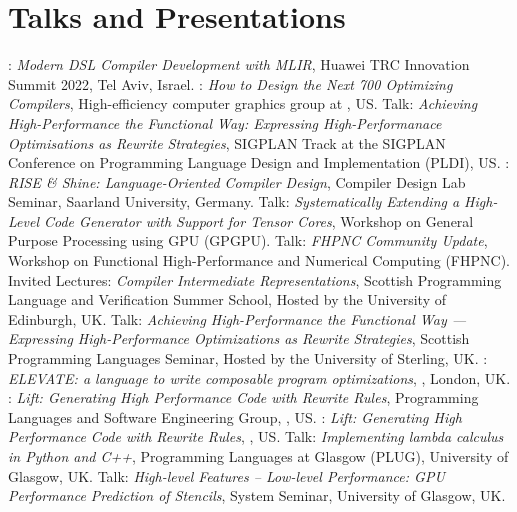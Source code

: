 \section{Talks and Presentations}
  {:
    \emph{Modern DSL Compiler Development with MLIR},
    \small Huawei TRC Innovation Summit 2022, Tel Aviv, Israel.}
  {:
    \emph{How to Design the Next 700 Optimizing Compilers},
    \small High-efficiency computer graphics group at , US.}
  {Talk: \emph{Achieving High-Performance the Functional Way: Expressing High-Performanace Optimisations as Rewrite Strategies},
    \small SIGPLAN Track at the SIGPLAN Conference on Programming Language Design and Implementation (PLDI), US.}
  {:
    \emph{RISE \& Shine: Language-Oriented Compiler Design},
    \small Compiler Design Lab Seminar, Saarland University, Germany.}
  {Talk: \emph{Systematically Extending a High-Level Code Generator with Support for Tensor Cores},
   \small Workshop on General Purpose Processing using GPU (GPGPU).}
  {Talk: \emph{FHPNC Community Update},
   \small Workshop on Functional High-Performance and Numerical Computing (FHPNC).}
  {Invited Lectures: \emph{Compiler Intermediate Representations},
  \small Scottish Programming Language and Verification Summer School,
  Hosted by the University of Edinburgh, UK.}
  {Talk: \emph{Achieving High-Performance the Functional Way — Expressing High-Performance Optimizations as Rewrite Strategies},
  \small Scottish Programming Languages Seminar,
  Hosted by the University of Sterling, UK.}
  {: \emph{ ELEVATE: a language to write composable program optimizations},
  \small {}, London, UK.}
  {: \emph{Lift: Generating High Performance Code with Rewrite Rules},
  \small Programming Languages and Software Engineering Group, , US.}
  {: \emph{Lift: Generating High Performance Code with Rewrite Rules},
    \small {}, US.}
         {Talk: \emph{Implementing lambda calculus in Python and C++},
          \small Programming Languages at Glasgow (PLUG), University of Glasgow, UK.}
         {Talk: \emph{High-level Features – Low-level Performance: GPU Performance Prediction of Stencils},
          \small System Seminar, University of Glasgow, UK.}
